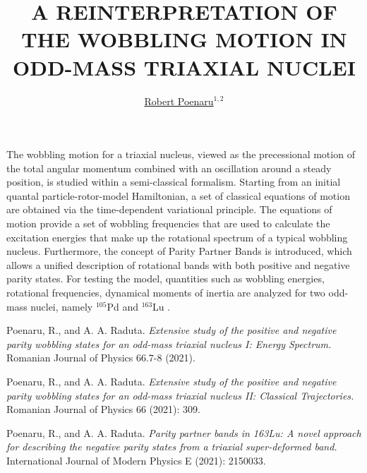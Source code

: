 ﻿\documentclass[a4paper,10pt,english]{article}
\begin{document}
\title{A REINTERPRETATION OF THE WOBBLING MOTION IN ODD-MASS TRIAXIAL NUCLEI}


\author{\uline{Robert Poenaru}$^{1,2}$}

\maketitle

\address{$^{1}$Doctoral School of Physics, University of Bucharest, Bucharest, Romania}

\address{$^{2}$Department of Theoretical Physics, NIPNE-HH, Magurele, Romania}


The wobbling motion for a triaxial nucleus, viewed as the precessional motion of the total angular momentum combined with an oscillation around a steady position, is studied within a semi-classical formalism. Starting from an initial quantal particle-rotor-model Hamiltonian, a set of classical equations of motion are obtained via the time-dependent variational principle. The equations of motion provide a set of wobbling frequencies that are used to calculate the excitation energies that make up the rotational spectrum of a typical wobbling nucleus. Furthermore, the concept of Parity Partner Bands is introduced, which allows a unified description of rotational bands with both positive and negative parity states. For testing the model, quantities such as wobbling energies, rotational frequencies, dynamical moments of inertia are analyzed for two odd-mass nuclei, namely $^{105}$Pd and $^{163}$Lu \cite{poenaru_rjp1,poenaru_rjp2,poenaru_ijmpe}.

\begin{thebibliography}{References}

 Poenaru, R., and A. A. Raduta. \textit{Extensive study of the positive and negative parity wobbling states for an odd-mass triaxial nucleus I: Energy Spectrum.} Romanian Journal of Physics 66.7-8 (2021).

 Poenaru, R., and A. A. Raduta. \textit{Extensive study of the positive and negative parity wobbling states for an odd-mass triaxial nucleus II: Classical Trajectories.} Romanian Journal of Physics 66 (2021): 309.

 Poenaru, R., and A. A. Raduta. \textit{Parity partner bands in 163Lu: A novel approach for describing the negative parity states from a triaxial super-deformed band.} International Journal of Modern Physics E (2021): 2150033.

\end{thebibliography}
\end{document}
